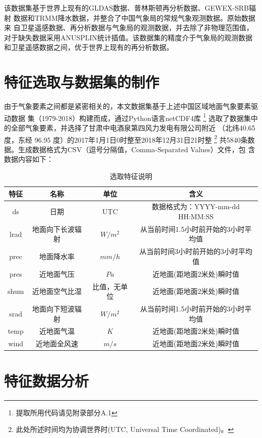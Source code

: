\documentclass[AutoFakeBold]{LZUThesis}
\begin{document}
该数据集基于世界上现有的GLDAS数据、普林斯顿再分析数据、GEWEX-SRB辐射
数据和TRMM降水数据，并整合了中国气象局的常规气象观测数据。原始数据来
自卫星遥感数据、再分析数据与气象局的观测数据，并去除了非物理范围值，
对于缺失数据采用ANUSPLIN统计插值。该数据集的精度介于气象局的观测数据
和卫星遥感数据之间，优于世界上现有的再分析数据。\cite{6bab74c1-f2dd-4e24-a833-81f33bedf9b1}

\section{特征选取与数据集的制作}
由于气象要素之间都是紧密相关的，本文数据集基于上述中国区域地面气象要素驱动数据
集（1979-2018）构建而成，通过Python语言netCDF4库
\footnote{提取所用代码请见附录部分A.1}
选取了数据集中的全部气象要素，并选择了甘肃中电酒泉第四风力发电有限公司附近
（北纬40.65 度，东经 96.95 度）的2017年1月1日0时整至2018年12月31日21时整
\footnote{此处所述时间均为协调世界时(UTC, Universal Time Coordinated)。}
共5840条数据。生成数据格式为CSV（逗号分隔值，Comma-Separated Values）文件，包
含数据内容如下：

\begin{table}[H]
    \centering
    \caption{选取特征说明}
    \begin{tabular}{cccc}
    \toprule
    特征 & 名称 & 单位 & 含义 \\
    \midrule
    ds & 日期 & UTC & 数据格式为：YYYY-mm-dd HH:MM:SS \\
    lrad & 地面向下长波辐射 & $W/m^2$ & 从当前时间1.5小时前开始的3小时平均值 \\
    prec & 地面降水率 & $mm/h$ & 从当前时间3小时前开始的3小时平均值 \\
    pres & 近地面气压 & $Pa$ & 近地面(距地面2米处)瞬时值 \\
    shum & 近地面空气比湿 & 比值，无单位 & 近地面(距地面2米处)瞬时值 \\
    srad & 地面向下短波辐射 & $W/m^2$ & 从当前时间1.5小时前开始的3小时平均值 \\
    temp & 近地面气温 & $K$ & 近地面(距地面2米处)瞬时值 \\
    wind & 近地面全风速 & $m/s$ & 近地面(距地面2米处)瞬时值 \\
    \bottomrule
    \end{tabular}
    \label{features}
\end{table}

\section{特征数据分析}
\end{document}
